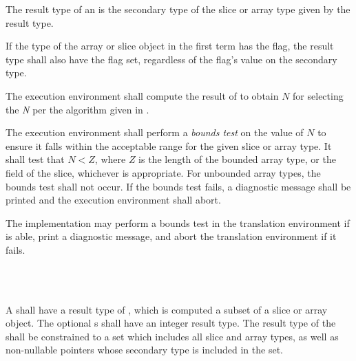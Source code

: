 \specsubsubitem
The result type of an  is the secondary type
of the slice or array type given by the  result
type.

\specsubsubitem
If the type of the array or slice object in the first term has the
 flag, the result type shall also have the 
flag set, regardless of the flag's value on the secondary type.

\specsubsubitem
The execution environment shall compute the result of
 to obtain $N$ for selecting the \textit{N} per the
algorithm given in .

\specsubsubitem
The execution environment shall perform a \textit{bounds test} on the value of
$N$ to ensure it falls within the acceptable range for the given slice or array
type. It shall test that $N < Z$, where $Z$ is the length of the bounded array
type, or the  field of the slice, whichever is appropriate.  For
unbounded array types, the bounds test shall not occur. If the bounds test
fails, a diagnostic message shall be printed and the execution environment
shall abort.

The implementation may perform a bounds test in the translation environment if
is able, print a diagnostic message, and abort the translation environment if
it fails.


\begin{grammar}
 \\
	 \terminal{[}    \terminal{]} \\
\end{grammar}

\specsubsubitem
A  shall have a result type of
, which is computed a subset of a slice or array object.
The optional s shall have an integer result type. The
result type of the  shall be constrained to
a set which includes all slice and array types, as well as non-nullable pointers
whose secondary type is included in the set.



